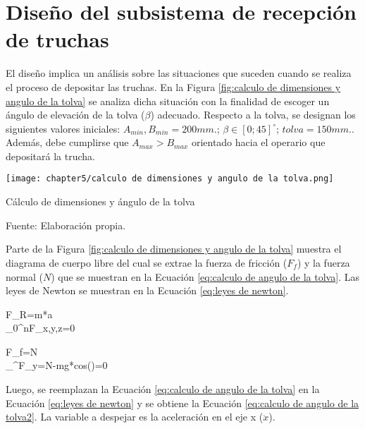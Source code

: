 \section{Diseño del subsistema de recepción de truchas}

El diseño implica un análisis sobre las situaciones que suceden cuando se realiza el proceso de depositar las truchas. En la Figura \ref{fig:calculo de dimensiones y angulo de la tolva} se analiza dicha situación con la finalidad de escoger un ángulo de elevación de la tolva ($\beta$) adecuado. Respecto a la tolva, se designan los siguientes valores iniciales: $A_{min},B_{min}=200 mm.$; $\beta \in [0;45] ^\circ$; ${tolva}=150 mm.$. Además, debe cumplirse que $A_{max}>B_{max}$ orientado hacia el operario que depositará la trucha.

\begin{myfigure}[H]
	\footnotesize\centering
	\texttt{[image: chapter5/calculo de dimensiones y angulo de la tolva.png]}
	\caption{Cálculo de dimensiones y ángulo de la tolva}
	\begin{myflushcenter}
		Fuente: Elaboración propia.
	\end{myflushcenter}
	\label{fig:calculo de dimensiones y angulo de la tolva}
\end{myfigure}

Parte de la Figura \ref{fig:calculo de dimensiones y angulo de la tolva} muestra el diagrama de cuerpo libre del cual se extrae la fuerza de fricción ($F_{f}$) y la fuerza normal ($N$) que se muestran en la Ecuación \ref{eq:calculo de angulo de la tolva}. Las leyes de Newton se muestran en la Ecuación \ref{eq:leyes de newton}. 

\begin{myequation}\label{eq:leyes de newton}
	\begin{split}
		F_{R}=m*a \\
		\sum_{0}^{n}F_{x,y,z}=0
	\end{split}
\end{myequation}

\begin{myequation}\label{eq:calculo de angulo de la tolva}
	\begin{split}
		F_{f}=\mu*N  \\
		\sum_{}^{}F_{y}=N-mg*cos(\beta)=0
	\end{split}
\end{myequation}

Luego, se reemplazan la Ecuación \ref{eq:calculo de angulo de la tolva} en la Ecuación \ref{eq:leyes de newton} y se obtiene la Ecuación \ref{eq:calculo de angulo de la tolva2}. La variable a despejar es la aceleración en el eje x ($\ddot{x}$).

